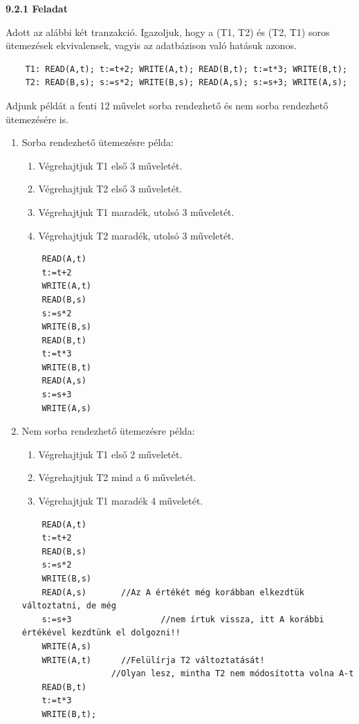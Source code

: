 \documentclass[a4paper,11.5pt, table]{article}
\begin{document}
	{\large \textbf{9.2.1 Feladat}}
	
	Adott az alábbi két tranzakció. Igazoljuk, hogy a (T1, T2) és (T2, T1) soros ütemezések ekvivalensek, vagyis az adatbázison való hatásuk azonos.
	\begin{lstlisting}
	T1: READ(A,t); t:=t+2; WRITE(A,t); READ(B,t); t:=t*3; WRITE(B,t);
	T2: READ(B,s); s:=s*2; WRITE(B,s); READ(A,s); s:=s+3; WRITE(A,s);
	\end{lstlisting}
	Adjunk példát a fenti 12 művelet sorba rendezhető és nem sorba rendezhető ütemezésére is.
	\begin{enumerate}[label = \alph*)]
		\item Sorba rendezhető ütemezésre példa:
		\begin{enumerate}
			\item Végrehajtjuk T1 első 3 műveletét.
			\item Végrehajtjuk T2 első 3 műveletét.
			\item Végrehajtjuk T1 maradék, utolsó 3 műveletét.
			\item Végrehajtjuk T2 maradék, utolsó 3 műveletét.
		\end{enumerate}
		
		\begin{lstlisting}
	READ(A,t) 
	t:=t+2
	WRITE(A,t)
	READ(B,s)
	s:=s*2
	WRITE(B,s)
	READ(B,t)
	t:=t*3
	WRITE(B,t)
	READ(A,s)
	s:=s+3
	WRITE(A,s)
		\end{lstlisting}
	
	
		\item Nem sorba rendezhető ütemezésre példa:
		\begin{enumerate}
			\item Végrehajtjuk T1 első 2 műveletét.
			\item Végrehajtjuk T2 mind a 6 műveletét.
			\item Végrehajtjuk T1 maradék 4 műveletét.
		\end{enumerate}
		\begin{lstlisting}
	READ(A,t)  
	t:=t+2
	READ(B,s)
	s:=s*2
	WRITE(B,s)
	READ(A,s) 		//Az A értékét még korábban elkezdtük változtatni, de még 
	s:=s+3 					//nem írtuk vissza, itt A korábbi értékével kezdtünk el dolgozni!!
	WRITE(A,s)		
	WRITE(A,t)		//Felülírja T2 változtatását! 
				  //Olyan lesz, mintha T2 nem módosította volna A-t
	READ(B,t)
	t:=t*3
	WRITE(B,t);
		\end{lstlisting}
	\end{enumerate} 
\end{document}
